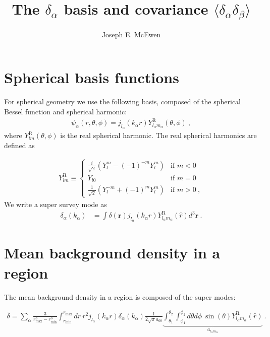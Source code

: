 \documentclass[11pt, oneside]{article}   	%
\title{The $\delta_\alpha$ basis and covariance $\langle \delta_\alpha \delta_\beta \rangle$}
\author{Joseph E. McEwen}
\newcommand{\sph}[2]{Y^\text{R}_{l_#1 m_#1}(\hat{#2})}
\newcommand{\jl}[1]{j_{l_#1}}
\begin{document}
\maketitle

\section{Spherical basis functions}
For spherical geometry we use the following basis, composed of the spherical Bessel function and spherical harmonic:
\begin{align} 
\psi_\alpha(r, \theta, \phi) = j_{l_\alpha}(k_\alpha r) Y^\text{R}_{l_\alpha m_\alpha}(\theta, \phi) ~, 
\end{align} 
where $Y^\text{R}_{lm}(\theta, \phi) $ is the real spherical harmonic. The real spherical harmonics are defined as 

\begin{align}\label{real_harmonic1}
Y^\text{R}_{lm} \equiv
\begin{cases} \frac{i}{\sqrt{2}} \left( Y_{l}^m  - (-1)^{-m} Y_{l}^m \right)& \text{if }  m < 0 \\
Y_{l0} & \text{if } m=0 \\
\frac{1}{\sqrt{2}}\left( Y_{l}^{-m} + (-1)^mY_{l}^m\right) & \text{if } m > 0 ~,
\end{cases}
\end{align} 
We write a super survey mode as 
\begin{align}
\delta_\alpha(k_\alpha)& = \int \delta(\mathbf{r}) \jl{\alpha}(k_\alpha r) \sph{\alpha}{r} d^3 \mathbf{r}~. 
\end{align}

\section{Mean background density in a region}
The mean background density in a region is composed of the super modes:

\begin{align}
\label{bar_delta}
\bar{\delta}= \displaystyle \sum_\alpha \frac{3}{r_\text{max}^3 - r_\text{min}^3} \int_{r_\text{min}}^ {r_\text{max} }dr ~ r^2 j_{l_\alpha}(k_\alpha r) \delta_\alpha(k_\alpha) \frac{1}{2\sqrt{\pi} a_{00}} \underbrace{ \int_{\theta_1}^{\theta_2 }\int_{\phi_1}^{\phi_2} d  \theta d \phi ~\sin(\theta)\sph{\alpha}{r}}_{a_{l_\alpha m_\alpha}} ~.
\end{align}
\end{document}
